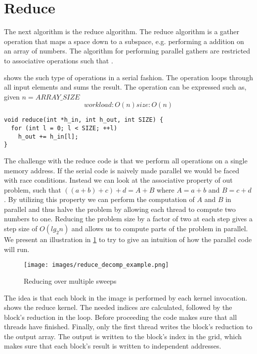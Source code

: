 \section{Reduce}
\label{sec:reduce}

The next algorithm is the reduce algorithm.
The reduce algorithm is a gather operation that maps a space down to a subspace, e.g. performing a addition on an array of numbers.
The algorithm for performing parallel gathers are restricted to associative operations such that .

 shows the such type of operations in a serial fashion.
The operation loops through all input elements and sums the result.
The operation can be expressed such as, given $n=ARRAY\_SIZE$
\begin{equation*}
work load: O(n)
size: O(n)
\end{equation*}
\begin{lstlisting}[caption={Serial reduce}, label={lst:reduce seq}]
void reduce(int *h_in, int h_out, int SIZE) {
  for (int l = 0; l < SIZE; ++l) 
    h_out += h_in[l];
}
\end{lstlisting}

The challenge with the reduce code is that we perform all operations on a single memory address.
If the serial code is naively made parallel we would be faced with race conditions.
Instead we can look at the associative property of out problem, such that $((a+b)+c)+d = A + B$ where $A=a+b$ and $B=c+d$.
By utilizing this property we can perform the computation of $A$ and $B$ in parallel and thus halve the problem by allowing each thread to compute two numbers to one.
Reducing the problem size by a factor of two at each step gives a step size of $O(lg_2n)$ and allows us to compute parts of the problem in parallel.
We present an illustration in \cref{fig:reduce decomp example} to try to give an intuition of how the parallel code will run.~\cite{reduceharris}

\begin{figure}[htb]
  \centering
  \texttt{[image: images/reduce\_decomp\_example.png]}
  \caption{Reducing over multiple sweeps}
  \label{fig:reduce decomp example}
\end{figure}

The idea is that each block in the image is performed by each kernel invocation.
 shows the reduce kernel.
The needed indices are calculated, followed by the block's reduction in the loop.
Before proceeding the code makes sure that all threads have finished.
Finally, only the first thread writes the block's reduction to the output array.
The output is written to the block's index in the grid, which makes sure that each block's result is written to independent addresses.


